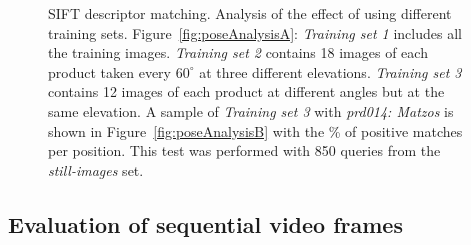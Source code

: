 \begin{figure}[h!]
\centering
{}


\caption{SIFT descriptor matching. Analysis of the effect of using different training sets. Figure~\ref{fig:poseAnalysisA}: \textit{Training set 1} includes all the training images. \textit{Training set 2} contains 18 images of each product taken every $60^\circ$ at three different elevations. \textit{Training set 3} contains 12 images of each product at different angles but at the same elevation. A sample of \textit{Training set 3} with \textit{prd014: Matzos} is shown in Figure~\ref{fig:poseAnalysisB} with the \% of positive matches per position. This test was performed with 850 queries from the \textit{still-images} set.}
        \label{fig:poseAnalysis}
\end{figure}


\subsection{Evaluation of sequential video frames} \label{subsec:evaluationframes}

